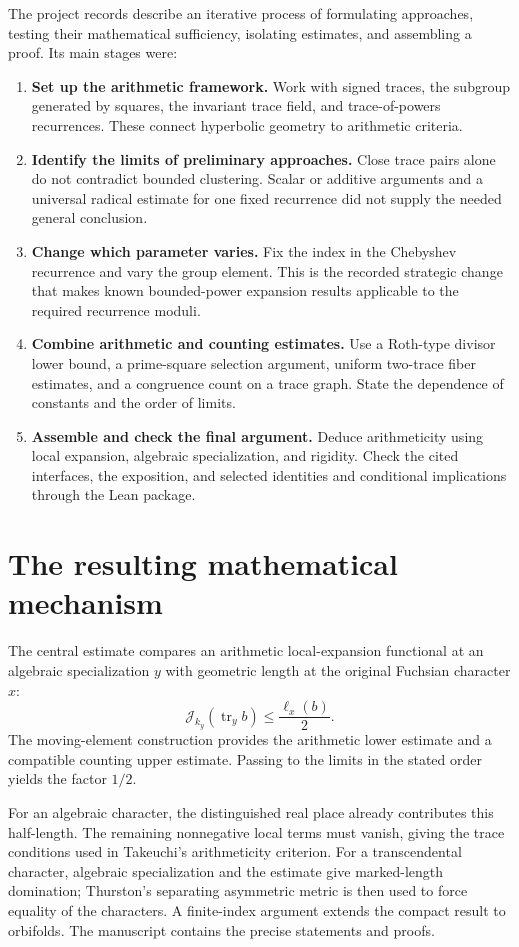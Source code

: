 \documentclass[11pt]{article}
\begin{document}
The project records describe an iterative process of formulating
approaches, testing their mathematical sufficiency, isolating estimates,
and assembling a proof. Its main stages were:
\begin{enumerate}[label=\textbf{\arabic*.}]
\item \textbf{Set up the arithmetic framework.}
  Work with signed traces, the subgroup generated by squares, the
  invariant trace field, and trace-of-powers recurrences. These connect
  hyperbolic geometry to arithmetic criteria.
\item \textbf{Identify the limits of preliminary approaches.}
  Close trace pairs alone do not contradict bounded clustering.
  Scalar or additive arguments and a universal radical estimate for one
  fixed recurrence did not supply the needed general conclusion.
\item \textbf{Change which parameter varies.}
  Fix the index in the Chebyshev recurrence and vary the group element.
  This is the recorded strategic change that makes known bounded-power
  expansion results applicable to the required recurrence moduli.
\item \textbf{Combine arithmetic and counting estimates.}
  Use a Roth-type divisor lower bound, a prime-square selection argument,
  uniform two-trace fiber estimates, and a congruence count on a trace
  graph. State the dependence of constants and the order of limits.
\item \textbf{Assemble and check the final argument.}
  Deduce arithmeticity using local expansion, algebraic specialization,
  and rigidity. Check the cited interfaces, the exposition, and selected
  identities and conditional implications through the Lean package.
\end{enumerate}

\section{The resulting mathematical mechanism}

The central estimate compares an arithmetic local-expansion functional at
an algebraic specialization \(y\) with geometric length at the original
Fuchsian character \(x\):
\[
 \mathcal J_{k_y}(\operatorname{tr}_y b)\leq\frac{\ell_x(b)}{2}.
\]
The moving-element construction provides the arithmetic lower estimate
and a compatible counting upper estimate. Passing to the limits in the
stated order yields the factor \(1/2\).

For an algebraic character, the distinguished real place already
contributes this half-length. The remaining nonnegative local terms must
vanish, giving the trace conditions used in Takeuchi's arithmeticity
criterion. For a transcendental character, algebraic specialization and
the estimate give marked-length domination; Thurston's separating
asymmetric metric is then used to force equality of the characters.
A finite-index argument extends the compact result to orbifolds.
The manuscript contains the precise statements and proofs.
\end{document}
